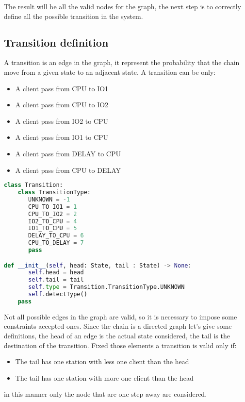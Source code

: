 \documentclass[12pt,a4paper]{article}
\begin{document}
The result will be all the valid nodes for the graph, the next step is to correctly define all the possible transition in the system.

\subsection{Transition definition}
A transition is an edge in the graph, it represent the probability that the chain move from a given state to an adjacent state. A transition can be only:
\begin{itemize}
    \item A client pass from CPU to IO1 
    \item A client pass from CPU to IO2 
    \item A client pass from IO2 to CPU
    \item A client pass from IO1 to CPU
    \item A client pass from DELAY to CPU
    \item A client pass from CPU to DELAY
\end{itemize}

\begin{lstlisting}[language=python]
class Transition:   
    class TransitionType:
       UNKNOWN = -1
       CPU_TO_IO1 = 1
       CPU_TO_IO2 = 2
       IO2_TO_CPU = 4
       IO1_TO_CPU = 5
       DELAY_TO_CPU = 6
       CPU_TO_DELAY = 7
       pass

def __init__(self, head: State, tail : State) -> None:
       self.head = head
       self.tail = tail
       self.type = Transition.TransitionType.UNKNOWN
       self.detectType()
    pass
\end{lstlisting}

\pagebreak

Not all possible edges in the graph are valid, so it is necessary to impose some constraints accepted ones. Since the chain is a directed graph let's give some definitions, the head of an edge is the actual state considered, the tail is the destination of the transition. Fixed those elements a transition is valid only if:


\begin{itemize}
    \item The tail has one station with less one client than the head 
    \item The tail has one station with more one client than the head 
\end{itemize}
in this manner only the node that are one step away are considered. 
\end{document}
